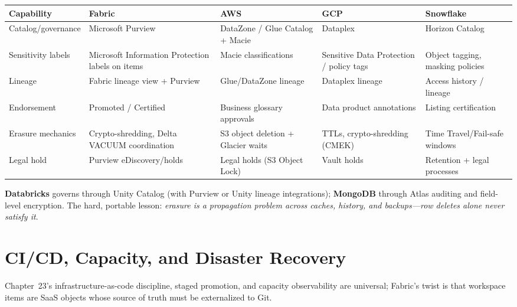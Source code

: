 \begin{center}
\footnotesize
\begin{tabular}{@{}p{2.8cm}p{3.2cm}p{3.2cm}p{3.2cm}p{3.2cm}@{}}
\toprule
\textbf{Capability} & \textbf{Fabric} & \textbf{AWS} & \textbf{GCP} & \textbf{Snowflake} \\
\midrule
Catalog/governance & Microsoft Purview & DataZone / Glue Catalog + Macie & Dataplex & Horizon Catalog \\
Sensitivity labels & Microsoft Information Protection labels on items & Macie classifications & Sensitive Data Protection / policy tags & Object tagging, masking policies \\
Lineage & Fabric lineage view + Purview & Glue/DataZone lineage & Dataplex lineage & Access history / lineage \\
Endorsement & Promoted / Certified & Business glossary approvals & Data product annotations & Listing certification \\
Erasure mechanics & Crypto-shredding, Delta VACUUM coordination & S3 object deletion + Glacier waits & TTLs, crypto-shredding (CMEK) & Time Travel/Fail-safe windows \\
Legal hold & Purview eDiscovery/holds & Legal holds (S3 Object Lock) & Vault holds & Retention + legal processes \\
\bottomrule
\end{tabular}
\end{center}

\noindent \textbf{Databricks} governs through Unity Catalog (with Purview or Unity lineage
integrations); \textbf{MongoDB} through Atlas auditing and field-level encryption. The hard,
portable lesson: \emph{erasure is a propagation problem across caches, history, and
backups---row deletes alone never satisfy it}.

\section{CI/CD, Capacity, and Disaster Recovery}
%
Chapter~23's infrastructure-as-code discipline, staged promotion, and capacity observability
are universal; Fabric's twist is that workspace items are SaaS objects whose source of truth
must be externalized to Git.

